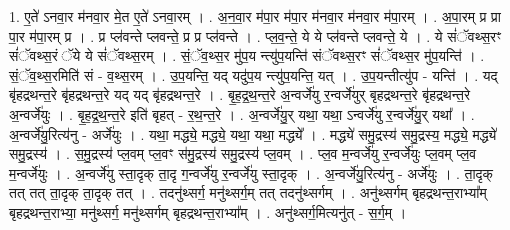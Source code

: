 \documentclass[17pt]{extarticle}
\begin{document}
1. ए॒ते॑ ऽनवा॒र म॑नवा॒र मे॒त ए॒ते॑ ऽनवा॒रम् । . अ॒न॒वा॒र म॑पा॒र म॑पा॒र म॑नवा॒र म॑नवा॒र म॑पा॒रम् । . अ॒पा॒रम् प्र प्रा पा॒र म॑पा॒रम् प्र । . प्र प्ल॑वन्ते प्लवन्ते॒ प्र प्र प्ल॑वन्ते । . प्ल॒व॒न्ते॒ ये ये प्ल॑वन्ते प्लवन्ते॒ ये । . ये सं॑ॅवथ्स॒रꣳ सं॑ॅवथ्स॒रं ॅये ये सं॑ॅवथ्स॒रम् । . सं॒ॅव॒थ्स॒र मु॑प॒य न्त्यु॑प॒यन्ति॑ संॅवथ्स॒रꣳ सं॑ॅवथ्स॒र मु॑प॒यन्ति॑ । . सं॒ॅव॒थ्स॒रमिति॑ सं - व॒थ्स॒रम् । . उ॒प॒यन्ति॒ यद् यदु॑प॒य न्त्यु॑प॒यन्ति॒ यत् । . उ॒प॒यन्तीत्यु॑प - यन्ति॑ । . यद् बृ॑हद्रथन्त॒रे बृ॑हद्रथन्त॒रे यद् यद् बृ॑हद्रथन्त॒रे । . बृ॒ह॒द्र॒थ॒न्त॒रे अ॒न्वर्जे॑यु र॒न्वर्जे॑युर् बृहद्रथन्त॒रे बृ॑हद्रथन्त॒रे अ॒न्वर्जे॑युः । . बृ॒ह॒द्र॒थ॒न्त॒रे इति॑ बृहत् - र॒थ॒न्त॒रे । . अ॒न्वर्जे॑यु॒र् यथा॒ यथा॒ ऽन्वर्जे॑यु र॒न्वर्जे॑यु॒र् यथा᳚ । . अ॒न्वर्जे॑यु॒रित्य॑नु - अर्जे॑युः । . यथा॒ मद्ध्ये॒ मद्ध्ये॒ यथा॒ यथा॒ मद्ध्ये᳚ । . मद्ध्ये॑ समु॒द्रस्य॑ समु॒द्रस्य॒ मद्ध्ये॒ मद्ध्ये॑ समु॒द्रस्य॑ । . स॒मु॒द्रस्य॑ प्ल॒वम् प्ल॒वꣳ स॑मु॒द्रस्य॑ समु॒द्रस्य॑ प्ल॒वम् । . प्ल॒व म॒न्वर्जे॑यु र॒न्वर्जे॑युः प्ल॒वम् प्ल॒व म॒न्वर्जे॑युः । . अ॒न्वर्जे॑यु स्ता॒दृक् ता॒दृ ग॒न्वर्जे॑यु र॒न्वर्जे॑यु स्ता॒दृक् । . अ॒न्वर्जे॑यु॒रित्य॑नु - अर्जे॑युः । . ता॒दृक् तत् तत् ता॒दृक् ता॒दृक् तत् । . तदनु॑थ्सर्ग॒ मनु॑थ्सर्ग॒म् तत् तदनु॑थ्सर्गम् । . अनु॑थ्सर्गम् बृहद्रथन्त॒राभ्या᳚म् बृहद्रथन्त॒राभ्या॒ मनु॑थ्सर्ग॒ मनु॑थ्सर्गम् बृहद्रथन्त॒राभ्या᳚म् । . अनु॑थ्सर्ग॒मित्यनु॑त् - स॒र्ग॒म् । \newline
\end{document}
